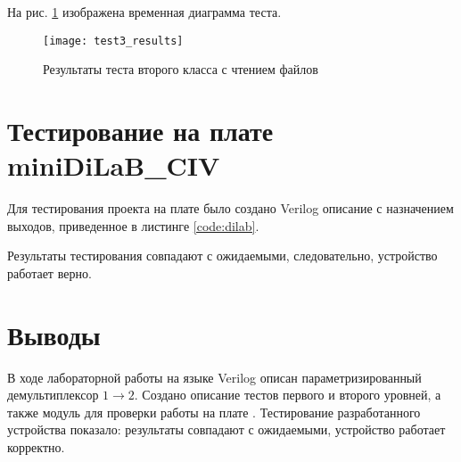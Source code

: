 На рис. \ref{fig:test3_results} изображена временная диаграмма теста.
\begin{figure}[H]
	\begin{center}
		\texttt{[image: test3\_results]}
		\caption{Результаты теста второго класса с чтением файлов}
		\label{fig:test3_results}
	\end{center}
\end{figure}

\section{Тестирование на плате miniDiLaB\_CIV}

Для тестирования проекта на плате было создано Verilog описание с назначением выходов, приведенное в листинге  \ref{code:dilab}.


Результаты тестирования совпадают с ожидаемыми, следовательно, устройство работает верно.

\section{Выводы}

В ходе лабораторной работы на языке Verilog описан параметризированный демультиплексор $1 \rightarrow 2$. Создано описание тестов первого и второго уровней, а также модуль для проверки работы на плате . Тестирование разработанного устройства показало: результаты совпадают с ожидаемыми, устройство работает корректно.

